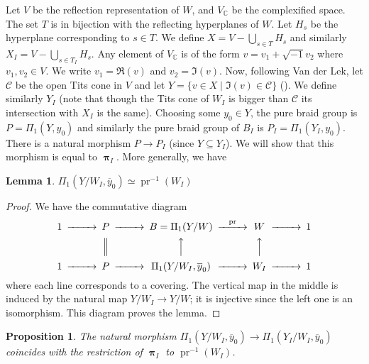 \documentclass{amsart}
\numberwithin{equation}{section}
\newtheorem{lemma}[equation]{Lemma}
\newtheorem{proposition}[equation]{Proposition}
\newcommand\inv{^{-1}}
\newcommand\BC{{\mathbb C}}
\newcommand\CC{{\mathcal C}}
\DeclareMathOperator\pr{pr}
\DeclareMathOperator\bpi{\boldsymbol\pi}
\begin{document}
Let $V$ be the reflection representation of $W$, and $V_\BC$ be the
complexified space. The set
$T$ is in bijection with the reflecting hyperplanes of $W$. Let $H_s$ be
the hyperplane corresponding to $s\in T$. We define
$X=V-\bigcup_{s\in T}H_s$ and similarly $X_I=V-\bigcup_{s\in T_I}H_s$.
Any element of $V_\BC$ is of the form $v=v_1+\sqrt{-1}v_2$ where $v_1,v_2\in V$.
We write $v_1=\Re(v)$ and $v_2=\Im(v)$.
Now, following Van der Lek, let $\CC$ be the open Tits cone in $V$ and let
$Y=\{v\in X\mid \Im(v)\in\CC\}$ (\cite[II, (3.2)]{VanderLek}). We define similarly $Y_I$ (note that
though the Tits cone of $W_I$ is bigger than $\CC$ its intersection with
$X_I$ is the same).
Choosing some $y_0\in Y$,
the pure braid group is $P=\Pi_1(Y,y_0)$ and similarly the pure braid group of
$B_I$ is $P_I=\Pi_1(Y_I,y_0)$. There is a natural morphism $P\to P_I$
(since $Y\subseteq Y_I$). We will show that this morphism is
equal to $\bpi_I$. More generally, we have
\begin{lemma} $\Pi_1(Y/W_I,\overline y_0)\simeq \pr\inv(W_I)$
\end{lemma}
\begin{proof}
We have the commutative diagram
$$\begin{CD}
 1 @>>> P @>>> B=\Pi_1(Y/W)@>\pr>> W@>>>1\\
@.@|@AAA@AAA\\
 1@>>>P@>>>\Pi_1(Y/W_I,\overline y_0)@>>>W_I@>>>1\\
\end{CD}$$
where each line corresponds to a covering. The vertical map in the middle
is induced by the natural map $Y/W_I\to Y/W$;
it is injective since the left one is an
isomorphism. This diagram proves the lemma.
\end{proof}
\begin{proposition} The natural morphism 
$\Pi_1(Y/W_I,\overline y_0)\to\Pi_1(Y_I/W_I,\overline y_0)$ coincides with
the restriction of $\bpi_I$ to $\pr\inv(W_I)$.
\end{proposition}
\end{document}
